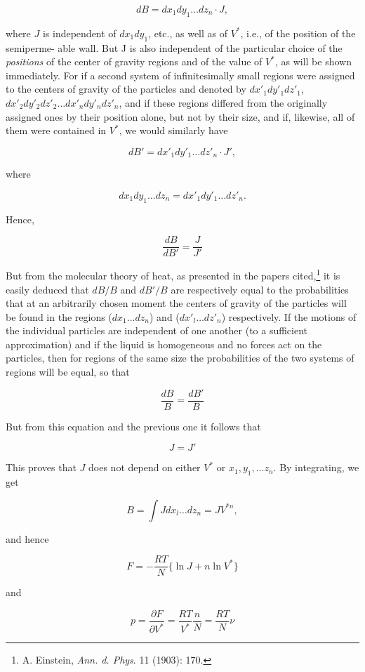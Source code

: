 \documentclass{article}
\begin{document}
\[dB= dx_{1}dy_{1} \ldots dz_{n} \cdot J, \]

where $J$ is independent of $dx_{1}dy_{1}$, etc., as well as of $V^{*}$, i.e., of the position of the semiperme-
able wall. But J is also independent of the particular choice of the \textit{positions} of the center of
gravity regions and of the value of $V^{*}$, as will be shown immediately. For if a second system of
infinitesimally small regions were assigned to the centers of gravity of the particles and denoted by
$dx'_{1}dy'_{1}dz'_{1}$, $dx'_{2}dy'_{2}dz'_{2} \ldots dx'_{n}dy'_{n}dz'_{n}$, and if these regions differed from the originally assigned ones by their position alone, but not by their size, and if, likewise, all of them were contained in $V^{*}$, we would similarly have

\[dB'=dx'_{1}dy'_{1} \ldots dz'_{n} \cdot J', \]

where

\[dx_{1}dy_{1} \ldots dz_{n}=dx'_{1}dy'_{1} \ldots dz'_{n}.\]

Hence,

\[\frac{dB}{dB'}=\frac{J}{J'} \]

But from the molecular theory of heat, as presented in the papers cited,\footnote{A. Einstein, \textit{Ann. d. Phys}. 11 (1903): 170.} it is easily deduced that
$dB/B$ and $dB′/B$ are respectively equal to the probabilities that at an arbitrarily chosen moment
the centers of gravity of the particles will be found in the regions ($dx_{1} \ldots dz_{n}$) and ($dx'_{l} \ldots dz'_{n}$)
respectively. If the motions of the individual particles are independent of one another (to a sufficient
approximation) and if the liquid is homogeneous and no forces act on the particles, then for regions
of the same size the probabilities of the two systems of regions will be equal, so that

\[\frac{dB}{B}=\frac{dB'}{B} \]

But from this equation and the previous one it follows that

\[J=J' \]

This proves that $J$ does not depend on either $V^{*}$ or $x_{1}, y_{1}, \ldots z_{n}$. By integrating, we get

\[B= \int Jdx_{l} \ldots dz_{n}=JV^{*n}, \]

and hence

\[F=-\frac{RT}{N}\lbrace\ln J+n \ln V^{*}\rbrace \]

and

\[p=\frac{\partial F}{\partial V^{*}}=\frac{RT}{V^{*}}\frac{n}{N}=\frac{RT}{N}\nu \]
\end{document}
